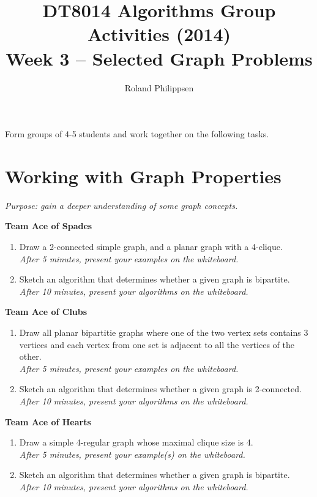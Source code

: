 \documentclass[a4paper]{article}
\begin{document}
\title{
  \large
  DT8014 Algorithms Group Activities (2014)\\
  \Large
  Week 3 -- Selected Graph Problems}
\author{Roland Philippsen}
\maketitle



\noindent
Form groups of 4-5 students and work together on the following tasks.


\section*{Working with Graph Properties}

\emph{Purpose: gain a deeper understanding of some graph concepts.}

\vspace{\baselineskip}
\noindent
\textbf{Team Ace of Spades}
\begin{enumerate}
\item
  Draw a 2-connected simple graph, and a planar graph with a 4-clique.\\
  \emph{After 5 minutes, present your examples on the whiteboard.}
\item
  Sketch an algorithm that determines whether a given graph is bipartite.\\
  \emph{After 10 minutes, present your algorithms on the whiteboard.}
\end{enumerate}

\vspace{\baselineskip}
\noindent
\textbf{Team Ace of Clubs}
\begin{enumerate}
\item
  Draw all planar bipartitie graphs where one of the two vertex sets contains 3 vertices and each vertex from one set is adjacent to all the vertices of the other.\\
  \emph{After 5 minutes, present your examples on the whiteboard.}
\item
  Sketch an algorithm that determines whether a given graph is 2-connected.\\
  \emph{After 10 minutes, present your algorithms on the whiteboard.}
\end{enumerate}
  
\vspace{\baselineskip}
\noindent
\textbf{Team Ace of Hearts}
\begin{enumerate}
\item
  Draw a simple 4-regular graph whose maximal clique size is 4.\\
  \emph{After 5 minutes, present your example(s) on the whiteboard.}
\item
  Sketch an algorithm that determines whether a given graph is bipartite.\\
  \emph{After 10 minutes, present your algorithms on the whiteboard.}
\end{enumerate}
\end{document}
